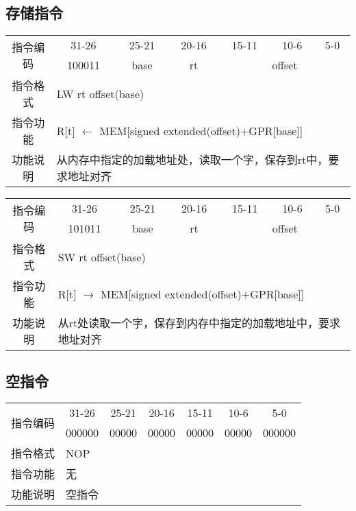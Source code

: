 \documentclass[a4paper,UTF8,fntef]{ctexart}
\begin{document}
\subsection{存储指令}
	\begin{table}[!hbp]
		\centering
		\begin{tabular}{|c|c|c|c|c|c|c|}
		\hline
		\multirow{2}{*}{指令编码} & 31-26&25-21 & 20-16&15-11 &10-6 &5-0\\
		\cline{2-7} & 100011 & base & rt & \multicolumn{3}{|c|}{offset} \\
		\hline
		指令格式&\multicolumn{6}{|l|}{LW rt offset(base)}\\
		\hline		
		指令功能&\multicolumn{6}{|l|}{R[t] $\leftarrow$ MEM[signed extended(offset)+GPR[base]]}\\
		\hline		
		功能说明&\multicolumn{6}{|l|}{从内存中指定的加载地址处，读取一个字，保存到rt中，要求地址对齐}\\
		\hline
		\end{tabular}
	\end{table}
	\begin{table}[!hbp]
		\centering
		\begin{tabular}{|c|c|c|c|c|c|c|}
		\hline
		\multirow{2}{*}{指令编码} & 31-26&25-21 & 20-16&15-11 &10-6 &5-0\\
		\cline{2-7} & 101011 & base & rt & \multicolumn{3}{|c|}{offset} \\
		\hline
		指令格式&\multicolumn{6}{|l|}{SW rt offset(base)}\\
		\hline		
		指令功能&\multicolumn{6}{|l|}{R[t] $\rightarrow$ MEM[signed extended(offset)+GPR[base]]}\\
		\hline		
		功能说明&\multicolumn{6}{|l|}{从rt处读取一个字，保存到内存中指定的加载地址中，要求地址对齐}\\
		\hline
		\end{tabular}
	\end{table}
\subsection{空指令}
	\begin{table}[!hbp]
		\centering
		\begin{tabular}{|c|c|c|c|c|c|c|}
		\hline
		\multirow{2}{*}{指令编码} & 31-26&25-21 & 20-16&15-11 &10-6 &5-0\\
		\cline{2-7} & 000000 & 00000 & 00000 & 00000& 00000& 000000 \\
		\hline
		指令格式&\multicolumn{6}{|l|}{NOP}\\
		\hline		
		指令功能&\multicolumn{6}{|l|}{无}\\
		\hline		
		功能说明&\multicolumn{6}{|l|}{空指令}\\
		\hline
		\end{tabular}
	\end{table}
\end{document}
